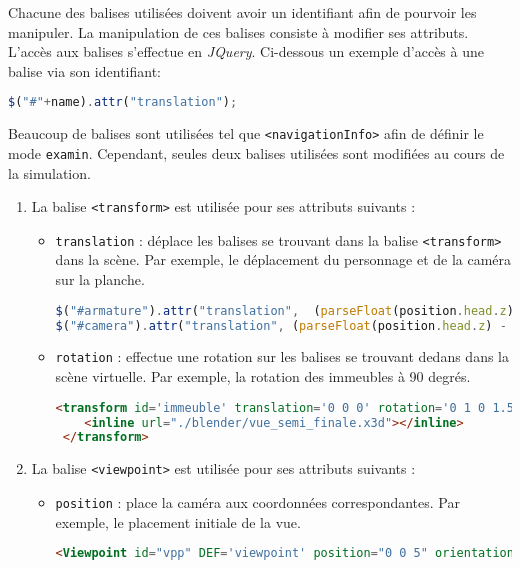 Chacune des balises utilisées doivent avoir un identifiant afin de pourvoir les manipuler. La manipulation de ces balises consiste à modifier ses attributs. L'accès aux balises s'effectue en \textit{JQuery}. Ci-dessous un exemple d'accès à une balise via son identifiant: 

\lstset{style=mystyle} 
\begin{lstlisting}[language=JavaScript]
$("#"+name).attr("translation");
\end{lstlisting}

Beaucoup de balises sont utilisées tel que \texttt{<navigationInfo>} afin de définir le mode \texttt{examin}. Cependant, seules deux balises utilisées sont modifiées au cours de la simulation. 
\begin{enumerate}
\item La balise \texttt{<transform>} est utilisée pour ses attributs suivants : 

\begin{itemize}
\item \texttt{translation} : déplace les balises se trouvant dans la balise \texttt{<transform>} dans la scène. Par exemple, le déplacement du personnage et de la caméra sur la planche.
\begin{lstlisting}[language=JavaScript]
$("#armature").attr("translation",  (parseFloat(position.head.z) - 4.0) + " 7.3 0");
$("#camera").attr("translation", (parseFloat(position.head.z) - 4.0) + " 8 " + (parseFloat(position.head.x) -0.2) );		
\end{lstlisting}

\item \texttt{rotation} : effectue une rotation sur les balises se trouvant dedans dans la scène virtuelle. Par exemple, la rotation des immeubles à 90 degrés. 
\begin{lstlisting}[language=Html]
<transform id='immeuble' translation='0 0 0' rotation='0 1 0 1.57' >
    <inline url="./blender/vue_semi_finale.x3d"></inline>
 </transform>
\end{lstlisting} 
\end{itemize}

\item La balise \texttt{<viewpoint>} est utilisée pour ses attributs suivants :

\begin{itemize}
\item \texttt{position} : place la caméra aux coordonnées correspondantes. Par exemple, le placement initiale de la vue.
\begin{lstlisting}[language=Html]
<Viewpoint id="vpp" DEF='viewpoint' position="0 0 5" orientation='1 0 0 -0.2' centerOfRotation="0 0 5"  fieldOfView="2.0" ></Viewpoint>	
\end{lstlisting} 


\end{itemize}
\end{enumerate}
